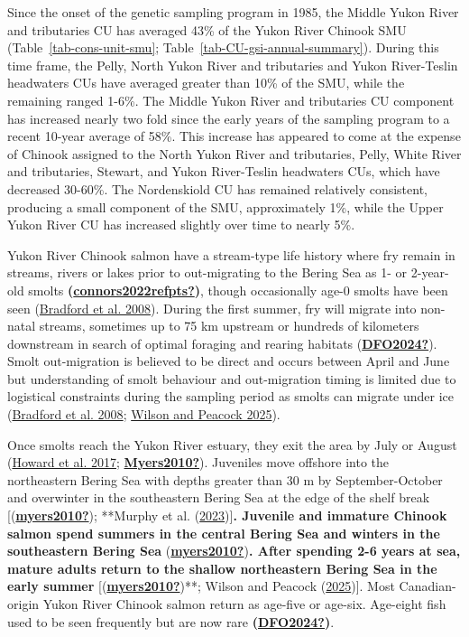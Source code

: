 \documentclass[11pt]{book}
\begin{document}
Since the onset of the genetic sampling program in 1985, the Middle Yukon River and tributaries CU has averaged 43\% of the Yukon River Chinook SMU (Table~\ref{tab-cons-unit-smu}; Table~\ref{tab-CU-gsi-annual-summary}). During this time frame, the Pelly, North Yukon River and tributaries and Yukon River-Teslin headwaters CUs have averaged greater than 10\% of the SMU, while the remaining ranged 1-6\%. The Middle Yukon River and tributaries CU component has increased nearly two fold since the early years of the sampling program to a recent 10-year average of 58\%. This increase has appeared to come at the expense of Chinook assigned to the North Yukon River and tributaries, Pelly, White River and tributaries, Stewart, and Yukon River-Teslin headwaters CUs, which have decreased 30-60\%. The Nordenskiold CU has remained relatively consistent, producing a small component of the SMU, approximately 1\%, while the Upper Yukon River CU has increased slightly over time to nearly 5\%.

Yukon River Chinook salmon have a stream-type life history where fry remain in streams, rivers or lakes prior to out-migrating to the Bering Sea as 1- or 2-year-old smolts \textbf{(\protect\hyperlink{ref-connors2022refpts}{\textbf{connors2022refpts?}})}, though occasionally age-0 smolts have been seen (\protect\hyperlink{ref-bradford2008}{Bradford et al. 2008}). During the first summer, fry will migrate into non-natal streams, sometimes up to 75 km upstream or hundreds of kilometers downstream in search of optimal foraging and rearing habitats (\protect\hyperlink{ref-DFO2024}{\textbf{DFO2024?}}). Smolt out-migration is believed to be direct and occurs between April and June but understanding of smolt behaviour and out-migration timing is limited due to logistical constraints during the sampling period as smolts can migrate under ice (\protect\hyperlink{ref-bradford2008}{Bradford et al. 2008}; \protect\hyperlink{ref-wilson2025}{Wilson and Peacock 2025}).

Once smolts reach the Yukon River estuary, they exit the area by July or August (\protect\hyperlink{ref-howard2017}{Howard et al. 2017}; \protect\hyperlink{ref-Myers2010}{\textbf{Myers2010?}}). Juveniles move offshore into the northeastern Bering Sea with depths greater than 30 m by September-October and overwinter in the southeastern Bering Sea at the edge of the shelf break {[}(\protect\hyperlink{ref-myers2010}{\textbf{myers2010?}}); **Murphy et al. (\protect\hyperlink{ref-murphy2023}{2023}){]}\textbf{. Juvenile and immature Chinook salmon spend summers in the central Bering Sea and winters in the southeastern Bering Sea }(\protect\hyperlink{ref-myers2010}{\textbf{myers2010?}})\textbf{. After spending 2-6 years at sea, mature adults return to the shallow northeastern Bering Sea in the early summer }{[}(\protect\hyperlink{ref-myers2010}{\textbf{myers2010?}})**; Wilson and Peacock (\protect\hyperlink{ref-wilson2025}{2025}){]}. Most Canadian-origin Yukon River Chinook salmon return as age-five or age-six. Age-eight fish used to be seen frequently but are now rare \textbf{(\protect\hyperlink{ref-DFO2024}{\textbf{DFO2024?}})}.
\end{document}
